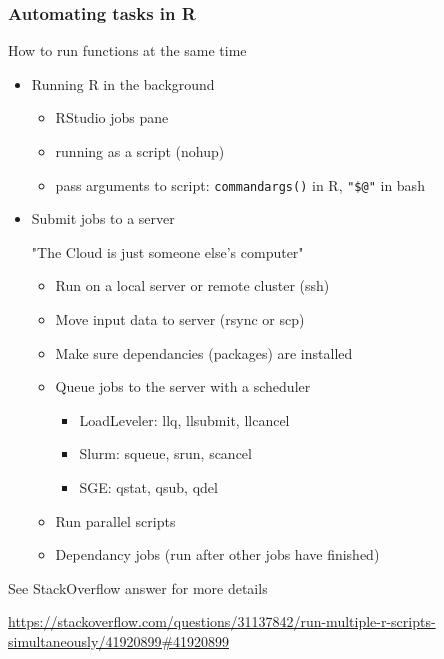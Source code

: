 \documentclass{beamer}
\begin{document}
           \begin{frame}
    \frametitle{ Automating tasks in R}
  
  How to run functions at the same time
  
      
     \begin{itemize}
    \item  Running R in the background
     
       \begin{itemize}
       \item  RStudio jobs pane
      \item  running as a script (nohup)
      \item  pass arguments to script: \texttt{commandargs()} in R, \texttt{"\$@"} in bash
      \end{itemize}

     \item Submit jobs to a server
     
     "The Cloud is just someone else's computer"
     
       \begin{itemize}
       \item  Run on a local server or remote cluster (ssh)
      \item   Move input data to server (rsync or scp)
      \item   Make sure dependancies (packages) are installed
      \item   Queue jobs to the server with a scheduler
      \begin{itemize}
      \item LoadLeveler: llq, llsubmit, llcancel
       \item  Slurm: squeue, srun, scancel
        \item SGE:   qstat, qsub, qdel 
        \end{itemize}
      
      \item Run parallel scripts
      \item Dependancy jobs (run after other jobs have finished)

      \end{itemize}
     \end{itemize}
     
     See StackOverflow answer for more details
      \end{frame}
      
            \begin{frame}
            \begin{center}
            
            \end{center}
      
      \small \url{https://stackoverflow.com/questions/31137842/run-multiple-r-scripts-simultaneously/41920899#41920899}
              \end{frame}
           
\end{document}
